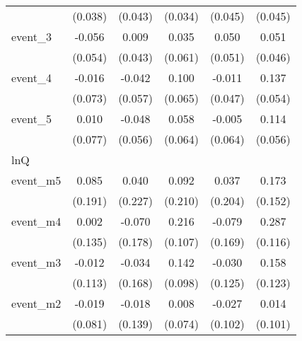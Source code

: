 {\begin{tabular}{l*{5}{c}}
            &     (0.038)         &     (0.043)         &     (0.034)         &     (0.045)         &     (0.045)         \\
[1em]
event\_3     &      -0.056         &       0.009         &       0.035         &       0.050         &       0.051         \\
            &     (0.054)         &     (0.043)         &     (0.061)         &     (0.051)         &     (0.046)         \\
[1em]
event\_4     &      -0.016         &      -0.042         &       0.100         &      -0.011         &       0.137\sym{*}  \\
            &     (0.073)         &     (0.057)         &     (0.065)         &     (0.047)         &     (0.054)         \\
[1em]
event\_5     &       0.010         &      -0.048         &       0.058         &      -0.005         &       0.114\sym{*}  \\
            &     (0.077)         &     (0.056)         &     (0.064)         &     (0.064)         &     (0.056)         \\
\hline
lnQ         &                     &                     &                     &                     &                     \\
event\_m5    &       0.085         &       0.040         &       0.092         &       0.037         &       0.173         \\
            &     (0.191)         &     (0.227)         &     (0.210)         &     (0.204)         &     (0.152)         \\
[1em]
event\_m4    &       0.002         &      -0.070         &       0.216\sym{*}  &      -0.079         &       0.287\sym{*}  \\
            &     (0.135)         &     (0.178)         &     (0.107)         &     (0.169)         &     (0.116)         \\
[1em]
event\_m3    &      -0.012         &      -0.034         &       0.142         &      -0.030         &       0.158         \\
            &     (0.113)         &     (0.168)         &     (0.098)         &     (0.125)         &     (0.123)         \\
[1em]
event\_m2    &      -0.019         &      -0.018         &       0.008         &      -0.027         &       0.014         \\
            &     (0.081)         &     (0.139)         &     (0.074)         &     (0.102)         &     (0.101)         \\

\end{tabular}}
